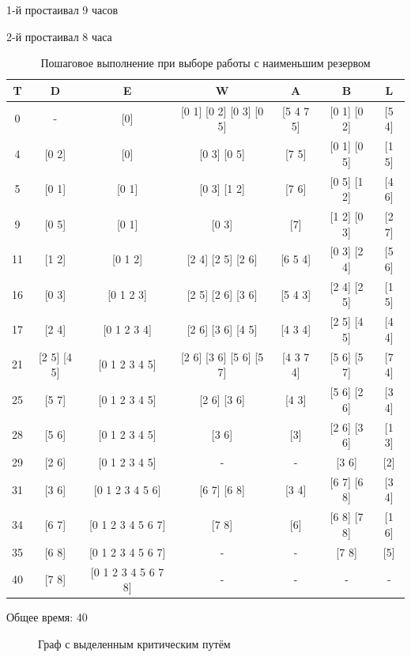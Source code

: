 \documentclass[a4paper,14pt]{extarticle}
\begin{document}
1-й простаивал 9 часов

2-й простаивал 8 часа

\begin{table}[H]
\caption{Пошаговое выполнение при выборе работы с наименьшим резервом}
\label{tabular:timesandtenses}
\begin{center}
\begin{tabular}{|c|c|c|c|c|c|c|}
\hline
T & D & E & W & A & B & L\\ \hline
0 & - & [0] & [0 1]
 [0 2]
 [0 3]
 [0 5] & [5 4 7 5] & [0 1]
 [0 2] & [5 4] \\ \hline 
 4 & [0 2] & [0] & [0 3]
 [0 5] & [7 5] & [0 1]
 [0 5] & [1 5] \\ \hline 
 5 & [0 1] & [0 1] & [0 3]
 [1 2] & [7 6] & [0 5]
 [1 2] & [4 6] \\ \hline 
 9 & [0 5] & [0 1] & [0 3] & [7] & [1 2]
 [0 3] & [2 7] \\ \hline 
 11 & [1 2] & [0 1 2] & [2 4]
 [2 5]
 [2 6] & [6 5 4] & [0 3]
 [2 4] & [5 6] \\ \hline 
 16 & [0 3] & [0 1 2 3] & [2 5]
 [2 6]
 [3 6] & [5 4 3] & [2 4]
 [2 5] & [1 5] \\ \hline 
 17 & [2 4] & [0 1 2 3 4] & [2 6]
 [3 6]
 [4 5] & [4 3 4] & [2 5]
 [4 5] & [4 4] \\ \hline 
 21 & [2 5]
 [4 5] & [0 1 2 3 4 5] & [2 6]
 [3 6]
 [5 6]
 [5 7] & [4 3 7 4] & [5 6]
 [5 7] & [7 4] \\ \hline 
 25 & [5 7] & [0 1 2 3 4 5] & [2 6]
 [3 6] & [4 3] & [5 6]
 [2 6] & [3 4] \\ \hline 
 28 & [5 6] & [0 1 2 3 4 5] & [3 6] & [3] & [2 6]
 [3 6] & [1 3] \\ \hline 
 29 & [2 6] & [0 1 2 3 4 5] & - & - & [3 6] & [2] \\ \hline 
 31 & [3 6] & [0 1 2 3 4 5 6] & [6 7]
 [6 8] & [3 4] & [6 7]
 [6 8] & [3 4] \\ \hline 
 34 & [6 7] & [0 1 2 3 4 5 6 7] & [7 8] & [6] & [6 8]
 [7 8] & [1 6] \\ \hline 
 35 & [6 8] & [0 1 2 3 4 5 6 7] & - & - & [7 8] & [5] \\ \hline 
 40 & [7 8] & [0 1 2 3 4 5 6 7 8] & - & - & - & - \\ \hline 
\end{tabular}
\end{center}
\end{table}

Общее время: 40

\begin{figure}[h]
\caption{Граф с выделенным критическим путём}
\label{ris:image}
\end{figure}
\end{document}
